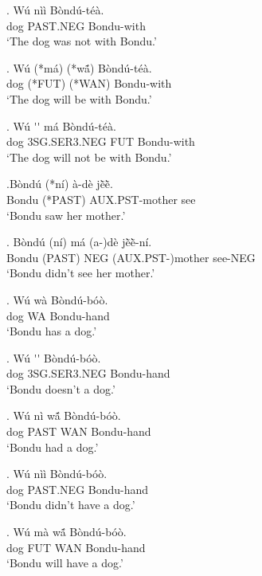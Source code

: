 \documentclass{assets/fieldnotes}
\begin{document}
\exg. W\'{u} n\`{i}\`{i} B\`{o}nd\'{u}-t\'{e}\`{a}. \\
dog PAST.NEG Bondu-with \\
`The dog was not with Bondu.'

\exg. W\'{u} (*m\'{a}) (*wã́) B\`{o}nd\'{u}-t\'{e}\`{a}. \\
dog (*FUT) (*WAN) Bondu-with \\
`The dog will be with Bondu.' 

\exg. W\'{u} \'{}\'{}  m\'{a} B\`{o}nd\'{u}-t\'{e}\`{a}. \\
dog 3SG.SER3.NEG FUT Bondu-with \\
`The dog will not be with Bondu.'


\exg.B\`{o}nd\'{u} (*n\'{i}) \`{a}-d\`{e} jẽ̀ẽ̀. \\
Bondu (*PAST) AUX.PST-mother see \\
`Bondu saw her mother.' 

\exg. B\`{o}nd\'{u} (n\'{i}) m\'{a} (a-)d\`{e} jẽ̀ẽ̀-n\'{i}. \\
Bondu (PAST) NEG (AUX.PST-)mother see-NEG \\
`Bondu didn't see her mother.'


\exg. W\'{u} w\`{a} B\`{o}nd\'{u}-b\'{o}\`{o}. \\ 
dog WA Bondu-hand \\
`Bondu has a dog.' 

\exg. W\'{u} \'{}\'{} B\`{o}nd\'{u}-b\'{o}\`{o}. \\ 
dog 3SG.SER3.NEG Bondu-hand \\
`Bondu doesn't a dog.' 

\exg. W\'{u} n\`{i} wã́ B\`{o}nd\'{u}-b\'{o}\`{o}. \\ 
dog PAST WAN Bondu-hand \\
`Bondu had a dog.'  

\exg. W\'{u} n\`{i}\`{i} B\`{o}nd\'{u}-b\'{o}\`{o}. \\ 
dog PAST.NEG Bondu-hand \\
`Bondu didn't have a dog.'  

\exg. W\'{u} m\`{a} wã́ B\`{o}nd\'{u}-b\'{o}\`{o}. \\ 
dog FUT WAN Bondu-hand \\
`Bondu will have a dog.'  
\end{document}

